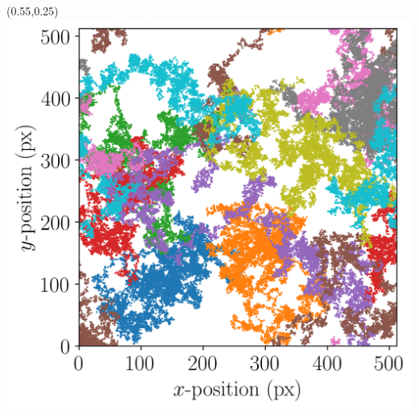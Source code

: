 {\begin{textblock}{0.45}(0.55,0.25)
\centering
	\textcolor{white}{Particle trajectory}\\[0.2cm]
\includegraphics[height = 0.6\textheight]{Sources/X-DFA/trajectory_plot_nPart10.png}
\end{textblock}
}








